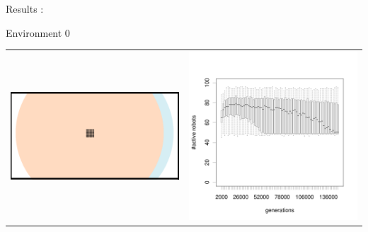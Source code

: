 \documentclass[8pt, handout=show,notes=show]{beamer}
\begin{document}
\begin{frame}{Results :}
\begin{figure}
 
\end{figure}

\end{frame}
\begin{frame}{Environment 0}



\begin{table}[H]
\begin{tabular}{cc}
\includegraphics[width=\imgSize]{../images/5StaticEnv/environments/staticEnv0}&\includegraphics[width=\imgSize]{../images/5StaticEnv/alive_staticEnv0}\\

\end{tabular}
\end{table}
\end{frame}
\end{document}

